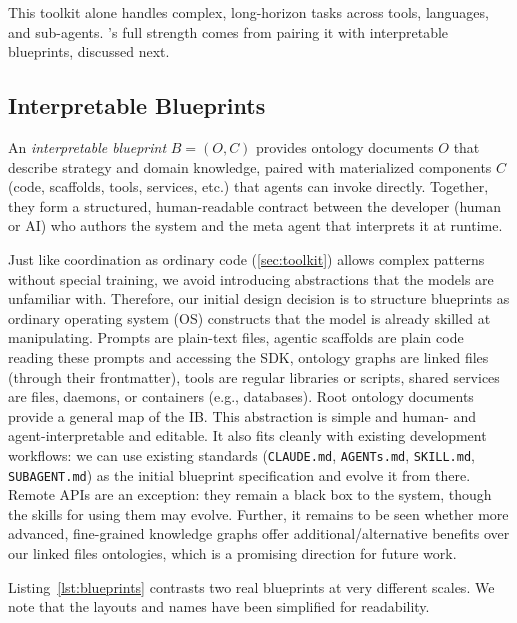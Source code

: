 This toolkit alone handles complex, long-horizon tasks across tools, languages, and sub-agents. \sysname's full strength comes from pairing it with interpretable blueprints, discussed next.

\subsection{Interpretable Blueprints}
\label{sec:ibs}
An \emph{interpretable blueprint} $B = (O, C)$ provides ontology documents $O$ that describe strategy and domain knowledge, paired with materialized components $C$ (code, scaffolds, tools, services, etc.) that agents can invoke directly.
Together, they form a structured, human-readable contract between the developer (human or AI) who authors the system and the meta agent that interprets it at runtime.


Just like coordination as ordinary code (\cref{sec:toolkit}) allows complex patterns without special training, we avoid introducing abstractions that the models are unfamiliar with. Therefore, our initial design decision is to structure blueprints as ordinary operating system (OS) constructs that the model is already skilled at manipulating. Prompts are plain-text files, agentic scaffolds are plain code reading these prompts and accessing the SDK, ontology graphs are linked files (through their frontmatter), tools are regular libraries or scripts, shared services are files, daemons, or containers (e.g., databases). Root ontology documents provide a general map of the IB. This abstraction is simple and human- and agent-interpretable and editable. It also fits cleanly with existing development workflows: we can use existing standards (\texttt{CLAUDE.md}, \texttt{AGENTs.md}, \texttt{SKILL.md}, \texttt{SUBAGENT.md}) as the initial blueprint specification and evolve it from there. Remote APIs are an exception: they remain a black box to the system, though the skills for using them may evolve. Further, it remains to be seen whether more advanced, fine-grained knowledge graphs offer additional/alternative benefits over our linked files ontologies, which is a promising direction for future work.

Listing~\ref{lst:blueprints} contrasts two real blueprints at very different scales. We note that the layouts and names have been simplified for readability.

